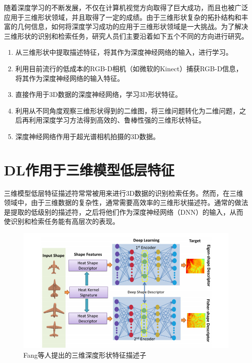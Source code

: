 \documentclass[twoside,UTF8]{nputhesis}
\begin{document}
随着深度学习的不断发展，不仅在计算机视觉方向取得了巨大成功，而且也被广泛应用于三维形状领域，并且取得了一定的成绩。由于三维形状复杂的拓扑结构和丰富的几何信息，如何将深度学习成功的应用于三维形状领域是一大挑战。为了解决三维形状的识别和检索任务，研究人员们主要沿着如下五个不同的方向进行研究。
\begin{enumerate}
\item 从三维形状中提取描述特征，将其作为深度神经网络的输入，进行学习。
\item 利用目前流行的低成本的RGB-D相机（如微软的Kinect）捕获RGB-D信息，将其作为深度神经网络的输入特征。
\item 直接作用于3D数据的深度神经网络，学习3D形状特征。
\item 利用从不同角度观察三维形状得到的二维图，将三维问题转化为二维问题，之后再利用深度学习方法得到高效的、鲁棒性强的三维形状特征。
\item 深度神经网络作用于超光谱相机拍摄的3D数据。
\end{enumerate}

\section{DL作用于三维模型低层特征}

三维模型低层特征描述符常常被用来进行3D数据的识别检索任务。然而，在三维领域中，由于三维数据的复杂性，通常需要高效率的三维形状描述符。通常的做法是提取的低级别的描述符，之后将他们作为深度神经网络（DNN）的输入，从而使识别和检索任务能有高层次的表现。
\begin{figure}[tb]
\begin{center}
\includegraphics[width=0.9\linewidth]{figures/Fang.jpg} 
\end{center} 
\vspace{-4mm}
\caption{Fang等人提出的三维深度形状特征描述子} 
\label{fig_Fang}
\end{figure}
\end{document}
